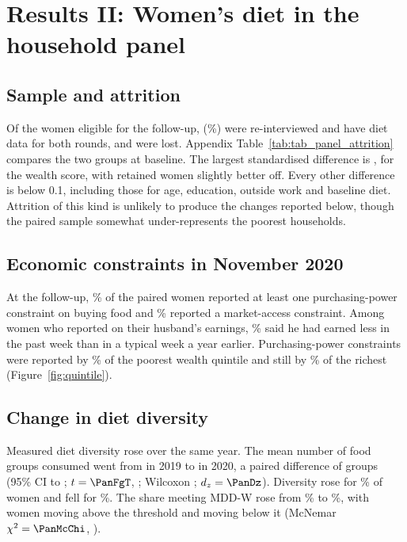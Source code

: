 \chapter{Results II: Women's diet in the household panel}\label{ch:household}

\section{Sample and attrition}\label{sec:attrition}
Of the \PanBase{} women eligible for the follow-up, \PanN{} (\PanRetention\%) were re-interviewed and have diet data for both rounds, and \PanLost{} were lost. Appendix Table~\ref{tab:tab_panel_attrition} compares the two groups at baseline. The largest standardised difference is \PanMaxSMD, for the wealth score, with retained women slightly better off. Every other difference is below 0.1, including those for age, education, outside work and baseline diet. Attrition of this kind is unlikely to produce the changes reported below, though the paired sample somewhat under-represents the poorest households.

\section{Economic constraints in November 2020}
At the follow-up, \PanPPP\% of the paired women reported at least one purchasing-power constraint on buying food and \PanMKT\% reported a market-access constraint. Among women who reported on their husband's earnings, \PanHbLow\% said he had earned less in the past week than in a typical week a year earlier. Purchasing-power constraints were reported by \PanQOnePPP\% of the poorest wealth quintile and still by \PanQFivePPP\% of the richest (Figure~\ref{fig:quintile}).

\section{Change in diet diversity}
Measured diet diversity rose over the same year. The mean number of food groups consumed went from \PanFgBefore{} in 2019 to \PanFgAfter{} in 2020, a paired difference of \PanFgDiff{} groups (95\% CI \PanFgCIlo{} to \PanFgCIhi; $t = \PanFgT$, \PanFgP; Wilcoxon \PanWilcoxP; $d_z = \PanDz$). Diversity rose for \PanImproved\% of women and fell for \PanDeclined\%. The share meeting MDD-W rose from \PanMddBefore\% to \PanMddAfter\%, with \PanMddGain{} women moving above the threshold and \PanMddLoss{} moving below it (McNemar $\chi^2 = \PanMcChi$, \PanMcP).

